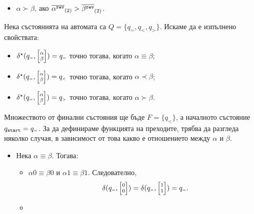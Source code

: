 \begin{extra2}
\begin{hint}
\begin{itemize}
  \item
    $\alpha \succ \beta$, ако $\overline{\alpha^{\texttt{rev}}}_{(2)} > \overline{\beta^{\texttt{rev}}}_{(2)}$.
  \end{itemize}
  Нека състоянията на автомата са $Q = \{q_{\scriptscriptstyle{=}},q_{\scriptscriptstyle{<}},q_{\scriptscriptstyle{>}}\}$.
  Искаме да е изпълнено свойствата:
  \begin{itemize}
  \item 
    $\delta^\star(q_{\scriptscriptstyle{=}}, \scriptsize{\begin{bmatrix} \alpha\\ \beta\end{bmatrix}}) = q_{\scriptscriptstyle{=}}$ точно тогава, когато $\alpha \equiv \beta$;
  \item 
    $\delta^\star(q_{\scriptscriptstyle{=}}, \scriptsize{\begin{bmatrix} \alpha\\ \beta\end{bmatrix}}) = q_{\scriptscriptstyle{<}}$ точно тогава, когато $\alpha \prec \beta$;
  \item 
    $\delta^\star(q_{\scriptscriptstyle{=}}, \scriptsize{\begin{bmatrix} \alpha\\ \beta\end{bmatrix}}) = q_{\scriptscriptstyle{>}}$ точно тогава, когато $\alpha \succ \beta$.
  \end{itemize}
  Множеството от финални състояния ще бъде $F = \{q_{\scriptscriptstyle{<}}\}$, а началното състояние $q_{\texttt{start}} = q_{\scriptscriptstyle{=}}$.
  За да дефинираме функцията на преходите, трябва да разгледа няколко случая, в зависимост от това какво е отношението между $\alpha$ и $\beta$.
  \begin{itemize}
  \item
    Нека $\alpha \equiv \beta$. Тогава:  
    \begin{itemize}
    \item 
      $\alpha 0 \equiv \beta 0$ и $\alpha 1 \equiv \beta 1$. Следователно,
      \[\delta(q_{\scriptscriptstyle{=}},\scriptsize{\begin{bmatrix} 0\\0\end{bmatrix}}) = \delta(q_{\scriptscriptstyle{=}},\scriptsize{\begin{bmatrix} 1\\1\end{bmatrix}}) = q_{\scriptscriptstyle{=}}.\]
    \item

\end{itemize}
\end{itemize}
\end{hint}
\end{extra2}
